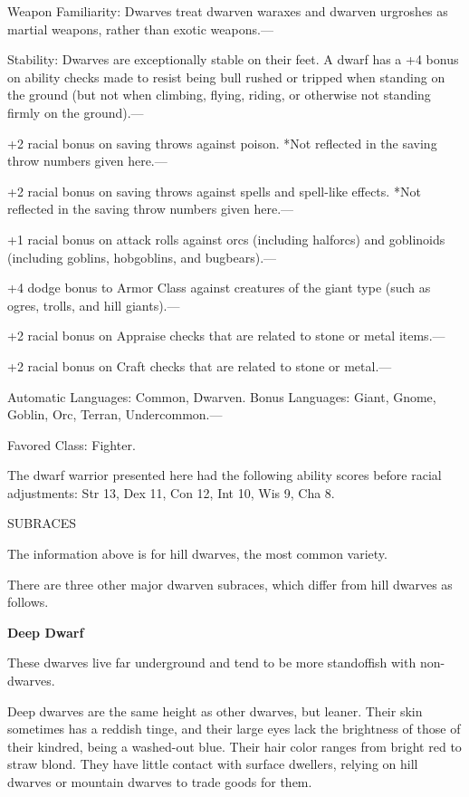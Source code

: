 \documentclass{article}
\begin{document}
{Weapon Familiarity: Dwarves treat dwarven waraxes and dwarven urgroshes as martial 
weapons, rather than exotic weapons.---

Stability: Dwarves are exceptionally stable on their feet. A dwarf has a +4 bonus 
on ability checks made to resist being bull rushed or tripped when standing on 
the ground (but not when climbing, flying, riding, or otherwise not standing firmly 
on the ground).--- 

\parindent=3pt
+2 racial bonus on saving throws against poison. *Not reflected in the saving throw 
numbers given here.--- 

+2 racial bonus on saving throws against spells and spell-like effects. *Not reflected 
in the saving throw numbers given here.--- 

\parindent=7pt
+1 racial bonus on attack rolls against orcs (including halforcs) and goblinoids 
(including goblins, hobgoblins, and bugbears).--- 

\parindent=3pt
+4 dodge bonus to Armor Class against creatures of the giant type (such as ogres, 
trolls, and hill giants).--- 

+2 racial bonus on Appraise checks that are related to stone or metal items.--- 

\parindent=7pt
+2 racial bonus on Craft checks that are related to stone or metal.---

\parindent=0pt
Automatic Languages: Common, Dwarven. Bonus Languages: Giant, Gnome, Goblin, Orc, 
Terran, Undercommon.---

Favored Class: Fighter.

The dwarf warrior presented here had the following ability scores before racial 
adjustments: Str 13, Dex 11, Con 12, Int 10, Wis 9, Cha 8.

SUBRACES

The information above is for hill dwarves, the most common variety.

There are three other major dwarven subraces, which differ from hill dwarves as 
follows.

\textbf{Deep Dwarf}

These dwarves live far underground and tend to be more standoffish with non-dwarves.

Deep dwarves are the same height as other dwarves, but leaner.  Their skin sometimes 
has a reddish tinge, and their large eyes lack the brightness of those of their 
kindred, being a washed-out blue. Their hair color ranges from bright red to straw 
blond. They have little contact with surface dwellers, relying on hill dwarves 
or mountain dwarves to trade goods for them.

}
\end{document}
